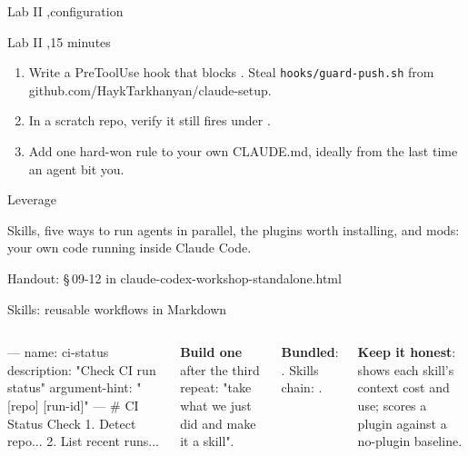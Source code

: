 \documentclass[aspectratio=169,11pt,t]{beamer}
\newcommand{\partframe}[4]{%
  \setsec{}%
  \begin{frame}[c]
    \lbl{Part #1}\par\vspace{0.5em}
    {\seriffamily\fontsize{40}{42}\selectfont #2}\par\vspace{0.8em}
    \begin{minipage}{0.8\textwidth}\raggedright\color{muted}#4\end{minipage}\par\vspace{1.4em}
    {\ttfamily\scriptsize\color{dim}Handout: \S\,#3 in claude-codex-workshop-standalone.html}
  \end{frame}}
\begin{document}
\setsec{}
\begin{frame}{Lab II \sep configuration}
  \begin{lab}{Lab II \sep 15 minutes}
    \begin{enumerate}\setlength\itemsep{0.5em}
      \item Write a PreToolUse hook that blocks . Steal \texttt{hooks/guard-push.sh} from github.com/HaykTarkhanyan/claude-setup.
      \item In a scratch repo, verify it still fires under .
      \item Add one hard-won rule to your own CLAUDE.md, ideally from the last time an agent bit you.
    \end{enumerate}
  \end{lab}
\end{frame}

\partframe{III}{Leverage}{09-12}{Skills, five ways to run agents in parallel, the plugins worth installing, and mods: your own code running inside Claude Code.}

\begin{frame}[fragile]{Skills: reusable workflows in Markdown}
  \begin{columns}[T,onlytextwidth]
\begin{code}[basicstyle=\ttfamily\scriptsize\color{codefg}]
---
name: ci-status
description: "Check CI run status"
argument-hint: "[repo] [run-id]"
---
# CI Status Check
1. Detect repo...
2. List recent runs...
\end{code}
      \small
      \textbf{Build one} after the third repeat: "take what we just did and make it a skill".\par\vspace{0.45em}
      \textbf{Bundled}:     . Skills chain: .\par\vspace{0.45em}
      \textbf{Keep it honest}:  shows each skill's context cost and use;  scores a plugin against a no-plugin baseline.
  \end{columns}
\end{frame}
\end{document}
